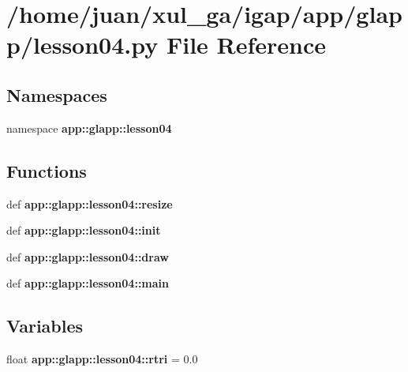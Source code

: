 \section{/home/juan/xul\_\-ga/igap/app/glapp/lesson04.py File Reference}
\label{lesson04_8py}
\subsection*{Namespaces}
\begin{CompactItemize}
\item 
namespace {\bf app::glapp::lesson04}
\end{CompactItemize}
\subsection*{Functions}
\begin{CompactItemize}
\item 
def {\bf app::glapp::lesson04::resize}
\item 
def {\bf app::glapp::lesson04::init}
\item 
def {\bf app::glapp::lesson04::draw}
\item 
def {\bf app::glapp::lesson04::main}
\end{CompactItemize}
\subsection*{Variables}
\begin{CompactItemize}
\item 
float {\bf app::glapp::lesson04::rtri} = 0.0
\end{CompactItemize}
